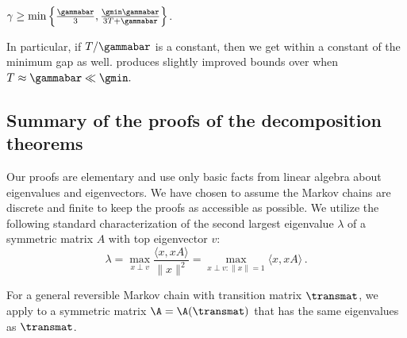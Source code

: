 \begin{corollary}\label{cor:compareT}
 $\gamma\geq \min\left\{\frac{\gammabar}{3}, \frac{\gmin\gammabar}{3T+\gammabar}\right\}$.
\end{corollary}

\noindent In particular, if $T/\gammabar$ is a constant, then
we get within a constant of the minimum gap as well.   produces
slightly improved bounds over  when
$T\approx \gammabar\ll \gmin.$  

\subsection{Summary of the proofs of the decomposition theorems}\label{sec:summary}
  
Our proofs are elementary and use only basic facts from linear algebra 
about eigenvalues and eigenvectors.  We have chosen to assume the 
Markov chains are discrete and finite to keep the proofs as accessible 
as possible. We utilize the following standard characterization of the 
second largest eigenvalue $\lambda$ of a symmetric matrix $A$ with top 
eigenvector $v$:
\begin{equation}\label{eq:eigen} 
\lambda = \max_{x\perp v}\frac{\langle x,xA\rangle}{\|x\|^2}
           = \max_{x\perp v:\|x\|=1}\langle x,xA\rangle\,.  
\end{equation} 

\noindent For a general reversible Markov chain with transition matrix 
$\transmat$, we apply  to a symmetric matrix 
$\A=\A(\transmat)$ that has the same eigenvalues as $\transmat$. 

